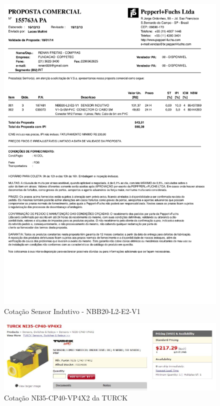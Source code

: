 \begin{figure}[h!]
 \centering
 \includegraphics[width=1\columnwidth]{Indutivo/price_quote_0.pdf}
 \caption{Cotação Sensor Indutivo - NBB20-L2-E2-V1 }
  
\end{figure}

\begin{figure}[h!]
 \centering
 \includegraphics[width=1\columnwidth]{Indutivo/price_quote_1}
 \caption{Cotação NI35-CP40-VP4X2 da TURCK}
  
\end{figure}

